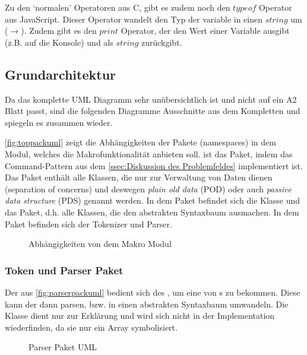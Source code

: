 {      Zu den `normalen' Operatoren aus C, gibt es zudem noch den \myMIn$typeof$ Operator aus JavaScript. Dieser Operator wandelt den Typ der variable in einen \myMIn$string$ um ($\rightarrow$). Zudem gibt es den \myMIn$print$ Operator, der den Wert einer Variable ausgibt (z.B. auf die Konsole) und als \myMIn$string$ zurückgibt.

  \subsection{Grundarchitektur}
  \label{ssec:Grundarchitektur}
    Da das komplette UML Diagramm sehr unübersichtlich ist und nicht auf ein A2 Blatt passt, sind die folgenden Diagramme Ausschnitte aus dem Kompletten und spiegeln es zusammen wieder.

    \autoref{fig:toppackuml} zeigt die Abhängigkeiten der Pakete (namespaces) in dem Modul, welches die Makrofunktionalität anbieten soll.  ist das Paket, indem das Command-Pattern aus dem \autoref{ssec:Diskussion des Problemfeldes} implementiert ist. Das  Paket enthält alle Klassen, die nur zur Verwaltung von Daten dienen (separation of concerns) und deswegen \emph{plain old data} (POD) oder auch \emph{passive data structure} (PDS) genannt werden. In dem  Paket befindet sich die  Klasse und das  Paket, d.h. alle Klassen, die den abstrakten Syntaxbaum ausmachen. In dem  Paket befinden sich der Tokenizer und Parser.
    \begin{figure}[H]
      \centering
      \caption{Abhängigkeiten von dem Makro Modul}
      \label{fig:toppackuml}
    \end{figure}

    \subsubsection{Token und Parser Paket}
    \label{sssec:Token und Parser Paket}
      Der  aus \autoref{fig:parserpackuml} bedient sich des , um eine  von s zu bekommen. Diese  kann der  dann parsen, bzw. in einen abstrakten Syntaxbaum umwandeln. Die  Klasse dient nur zur Erklärung und wird sich nicht in der Implementation wiederfinden, da sie nur ein Array symbolisiert.
      \begin{figure}[H]
        \centering
        \caption{Parser Paket UML}
        \label{fig:parserpackuml}
      \end{figure}

}
